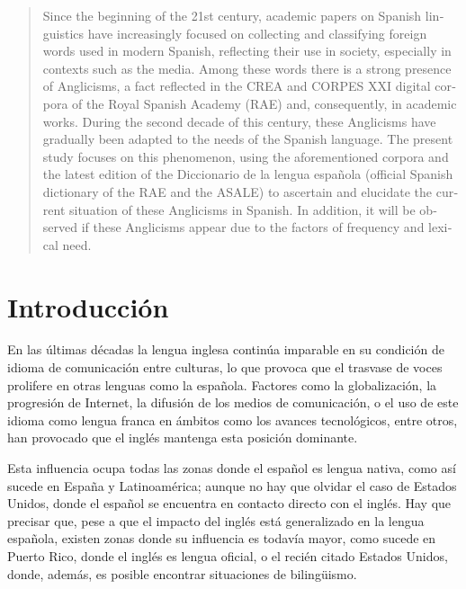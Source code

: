 \documentclass{textolivre}
\begin{document}
\begin{poliabstract}
\begin{portuguese}
\begin{abstract}
\end{abstract}
\end{portuguese}

\begin{english}
\begin{abstract}
Since the beginning of the 21st century, academic papers on Spanish linguistics have increasingly focused on collecting and classifying foreign words used in modern Spanish, reflecting their use in society, especially in contexts such as the media. Among these words there is a strong presence of Anglicisms, a fact reflected in the CREA and CORPES XXI digital corpora of the Royal Spanish Academy (RAE) and, consequently, in academic works. During the second decade of this century, these Anglicisms have gradually been adapted to the needs of the Spanish language. The present study focuses on this phenomenon, using the aforementioned corpora and the latest edition of the Diccionario de la lengua española (official Spanish dictionary of the RAE and the ASALE) to ascertain and elucidate the current situation of these Anglicisms in Spanish. In addition, it will be observed if these Anglicisms appear due to the factors of frequency and lexical need.

\end{abstract}
\end{english}

\end{poliabstract}


\section{Introducción}\label{sec-intro}
En las últimas décadas la lengua inglesa continúa imparable en su condición de idioma de comunicación entre culturas, lo que provoca que el trasvase de voces prolifere en otras lenguas como la española. Factores como la globalización, la progresión de Internet, la difusión de los medios de comunicación, o el uso de este idioma como lengua franca en ámbitos como los avances tecnológicos, entre otros, han provocado que el inglés mantenga esta posición dominante.

Esta influencia ocupa todas las zonas donde el español es lengua nativa, como así sucede en España y Latinoamérica; aunque no hay que olvidar el caso de Estados Unidos, donde el español se encuentra en contacto directo con el inglés. Hay que precisar que, pese a que el impacto del inglés está generalizado en la lengua española, existen zonas donde su influencia es todavía mayor, como sucede en Puerto Rico, donde el inglés es lengua oficial, o el recién citado Estados Unidos, donde, además, es posible encontrar situaciones de bilingüismo. 
\end{document}
